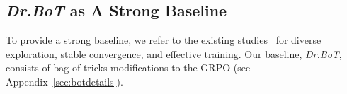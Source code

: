 \documentclass[]{youtu} %
\begin{document}
\subsection{\textit{Dr.BoT} as A Strong Baseline}
\label{sec:strong-baseline}

To provide a strong baseline,
we refer to the existing studies~\cite{liu2025part,sun2025stabilizing,bai2025towards,cui2025entropy} for diverse exploration,
stable convergence,
and effective training.
Our baseline,
\textit{Dr.BoT},
consists of bag-of-tricks modifications to the GRPO (see Appendix~\ref{sec:botdetails}).


\begin{table}[htbp]
\centering
\caption{Results on ALFWorld \& WebShop (\%).
PT \& FW
stand for prompting \& framework.
}
\label{tab:ALFWorldwebshop}
\end{table}
\end{document}

